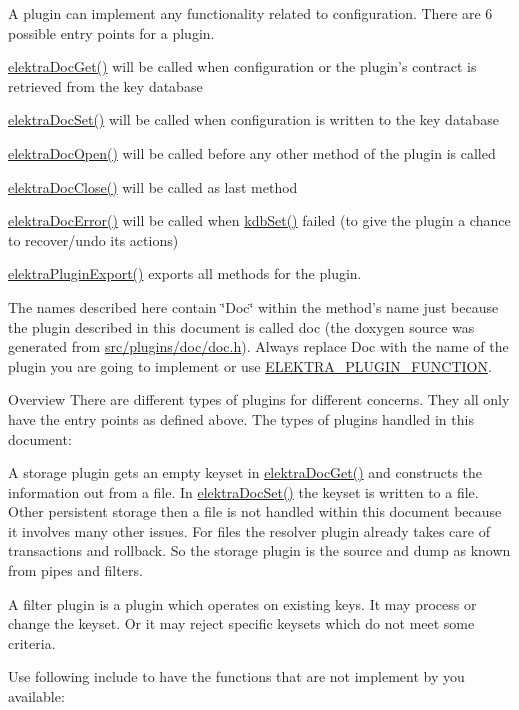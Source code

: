 A plugin can implement any functionality related to configuration. There are 6 possible entry points for a plugin.
\begin{DoxyItemize}
\item \hyperlink{group__plugin_gacb69f3441c6d84241b4362f958fbe313}{elektra\+Doc\+Get()} will be called when configuration or the plugin's contract is retrieved from the key database
\item \hyperlink{group__plugin_gae65781a1deb34efc79c8cb9d9174842c}{elektra\+Doc\+Set()} will be called when configuration is written to the key database
\item \hyperlink{group__plugin_ga23c2eb3584e38a4d494eb8f91e5e3d8d}{elektra\+Doc\+Open()} will be called before any other method of the plugin is called
\item \hyperlink{group__plugin_ga1236aefe5b2baf8b7bf636ba5aa9ea29}{elektra\+Doc\+Close()} will be called as last method
\item \hyperlink{group__plugin_gad74b35f558ac7c3262f6069c5c47dc79}{elektra\+Doc\+Error()} will be called when \hyperlink{group__kdb_ga11436b058408f83d303ca5e996832bcf}{kdb\+Set()} failed (to give the plugin a chance to recover/undo its actions)
\item \hyperlink{group__plugin_ga8dd092048e972a3f0c9c9f54eb41576e}{elektra\+Plugin\+Export()} exports all methods for the plugin.
\end{DoxyItemize}

The names described here contain \char`\"{}\+Doc\char`\"{} within the method's name just because the plugin described in this document is called doc (the doxygen source was generated from \hyperlink{doc_8h}{src/plugins/doc/doc.\+h}). Always replace Doc with the name of the plugin you are going to implement or use \hyperlink{group__plugin_ga34d1a66f0a6e89cfd20f4014a9975a2a}{E\+L\+E\+K\+T\+R\+A\+\_\+\+P\+L\+U\+G\+I\+N\+\_\+\+F\+U\+N\+C\+T\+I\+O\+N}.

\begin{DoxyParagraph}{Overview}
There are different types of plugins for different concerns. They all only have the entry points as defined above. The types of plugins handled in this document\+:
\begin{DoxyItemize}
\item A storage plugin gets an empty keyset in \hyperlink{group__plugin_gacb69f3441c6d84241b4362f958fbe313}{elektra\+Doc\+Get()} and constructs the information out from a file. In \hyperlink{group__plugin_gae65781a1deb34efc79c8cb9d9174842c}{elektra\+Doc\+Set()} the keyset is written to a file. ~\newline
 Other persistent storage then a file is not handled within this document because it involves many other issues. For files the resolver plugin already takes care of transactions and rollback. So the storage plugin is the source and dump as known from pipes and filters.
\item A filter plugin is a plugin which operates on existing keys. It may process or change the keyset. Or it may reject specific keysets which do not meet some criteria.
\end{DoxyItemize}
\end{DoxyParagraph}
Use following include to have the functions that are not implement by you available\+:


